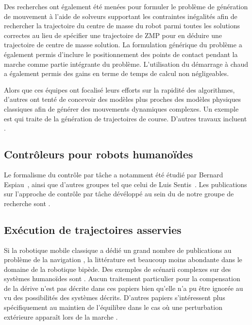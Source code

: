 Des recherches ont également été menées pour formuler le problème de
génération de mouvement à l'aide de solveurs supportant les
contraintes inégalités
\cite{11dimitrov.icra,10herdt.ar} afin de rechercher la trajectoire du
centre de masse du robot parmi toutes les solutions correctes au lieu
de spécifier une trajectoire de ZMP pour en déduire une trajectoire de
centre de masse solution. La formulation générique du problème a
également permis d'inclure le positionnement des points de contact
pendant la marche comme partie intégrante du problème. L'utilisation
du démarrage à chaud \cite{09dimitrov.icra} a
également permis des gains en terme de temps de calcul non
négligeables.


Alors que ces équipes ont focalisé leurs efforts sur la rapidité des
algorithmes, d'autres ont tenté de concevoir des modèles plus proches
des modèles physiques classiques afin de générer des mouvements
dynamiques complexes. Un exemple est \cite{09mombaur.robotica} qui
traite de la génération de trajectoires de course. D'autres travaux
incluent \cite{07suleiman.humanoids,08kanehiro.rsj}.


\subsection{Contrôleurs pour robots humanoïdes}


Le formalisme du contrôle par tâche a notamment été étudié par Bernard
Espiau \cite{89iser.rives}, ainsi que d'autres groupes tel que celui
de Luis Sentis \cite{05sentis.icra}. Les publications sur l'approche
de contrôle par tâche dévéloppé au sein du de notre groupe de
recherche sont
\cite{09mansard.icar,05yoshida.humanoids,10kanoun.humanoids}.


\subsection{Exécution de trajectoires asservies}

Si la robotique mobile classique a dédié un grand nombre de
publications au problème de la navigation
\cite{91samson.icra,05lefebvre.icra}, la littérature est beaucoup
moins abondante dans le domaine de la robotique bipède. Des exemples
de scénarii complexes sur des systèmes humanoïdes sont
\cite{05michel.humanoids,10chestnutt,09chestnutt.rsj}. Aucun
traitement particulier pour la compensation de la dérive n'est pas
décrite dans ces papiers bien qu'elle n'a pu être ignorée au vu des
possibilités des systèmes décrits. D'autres papiers s'intéressent plus
spécifiquement au maintien de l'équilibre dans le cas où une
perturbation extérieure apparaît lors de la marche
\cite{07morisawa.icra}.



